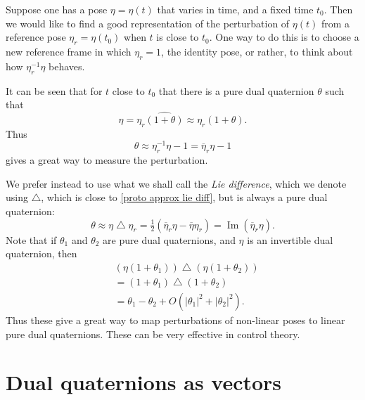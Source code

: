 \documentclass[reqno,12pt]{amsart}
\DeclareMathOperator\imagpart{Im}
\newcommand{\liediff}{\mathbin{\triangle}}
\begin{document}
Suppose one has a pose $\eta = \eta(t)$ that varies in time, and a fixed time $t_0$.  Then we would like to find a good representation of the perturbation of $\eta(t)$ from a reference pose $\eta_r = \eta(t_0)$ when $t$ is close to $t_0$.  One way to do this is to choose a new reference frame in which $\eta_r = 1$, the identity pose, or rather, to think about how $\eta_r ^{-1} \eta$ behaves.

It can be seen that for $t$ close to $t_0$ that there is a pure dual quaternion $\theta$ such that
\begin{equation}
\eta = \eta_r \widehat{(1 + \theta)} \approx \eta_r (1 + \theta) .
\end{equation}
Thus
\begin{equation}
\label{proto approx lie diff}
\theta \approx \eta_r^{-1} \eta - 1 = \overline\eta_r \eta - 1
\end{equation}
gives a great way to measure the perturbation.

We prefer instead to use what we shall call the \emph{Lie difference}, which we denote using $\liediff$, which is close to \eqref{proto approx lie diff}, but is always a pure dual quaternion:
\begin{equation}
\theta \approx \eta\liediff\eta_r = \tfrac12 (\overline\eta_r \eta - \overline\eta \eta_r) = \imagpart(\overline\eta_r \eta).
\end{equation}
Note that if $\theta_1$ and $\theta_2$ are pure dual quaternions, and $\eta$ is an invertible dual quaternion, then
\begin{equation}
\label{approx approx lie diff}
\begin{aligned}
&(\eta(1+\theta_1)) \liediff (\eta(1+\theta_2)) \\&= (1+\theta_1) \liediff (1+\theta_2) \\&= \theta_1 - \theta_2 + O(|\theta_1|^2 + |\theta_2|^2).
\end{aligned}
\end{equation}
Thus these give a great way to map perturbations of non-linear poses to linear pure dual quaternions.  These can be very effective in control theory.

\section{Dual quaternions as vectors}
\end{document}
